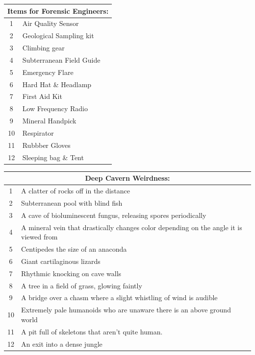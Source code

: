 \documentclass[landscape]{book}
\begin{document}
\begin{multicols*}{4}
\begin{center}
  \begin{tabular}{|c|p{}|}
    \hline \multicolumn{2}{|c|}{Items for Forensic Engineers:} \\
    \hline 1 & Air Quality Sensor \\
    2 & Geological Sampling kit \\
    3 & Climbing gear \\
    4 & Subterranean Field Guide \\
    5 & Emergency Flare \\
    6 & Hard Hat \& Headlamp \\
    7 & First Aid Kit \\
    8 & Low Frequency Radio \\
    9 & Mineral Handpick \\
    10 & Respirator \\
    11 & Rubbber Gloves \\
    12 & Sleeping bag \& Tent \\ \hline
  \end{tabular}
\end{center}
\vfill
\columnbreak
\begin{center}
  \begin{tabular}{|c|p{}|}
    \hline \multicolumn{2}{|c|}{Deep Cavern Weirdness:} \\
    \hline 1 & A clatter of rocks off in the distance                                            \\
    2 & Subterranean pool with blind fish                                                        \\
    3 & A cave of bioluminescent fungus, releasing spores periodically                           \\
    4 & A mineral vein that drastically changes color depending on the angle it is viewed from   \\
    5 & Centipedes the size of an anaconda                                                       \\
    6 & Giant cartilaginous lizards                                                              \\
    7 & Rhythmic knocking on cave walls                                                          \\
    8 & A tree in a field of grass, glowing faintly                                              \\
    9 & A bridge over a chasm where a slight whistling of wind is audible                        \\
    10 & Extremely pale humanoids who are unaware there is an above ground world                  \\
    11 & A pit full of skeletons that aren't quite human.                                        \\
    12 & An exit into a dense jungle                                                             \\ \hline
  \end{tabular}
\end{center}


\end{multicols*}
\end{document}

